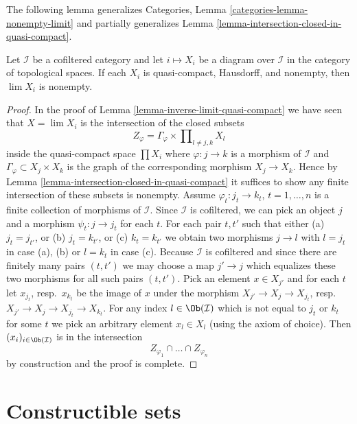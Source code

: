 \noindent
The following lemma generalizes
Categories, Lemma \ref{categories-lemma-nonempty-limit}
and partially generalizes
Lemma \ref{lemma-intersection-closed-in-quasi-compact}.

\begin{lemma}
\label{lemma-nonempty-limit}
Let $\mathcal{I}$ be a cofiltered category and let $i \mapsto X_i$
be a diagram over $\mathcal{I}$ in the category of topological
spaces. If each $X_i$ is quasi-compact, Hausdorff, and nonempty, then
$\lim X_i$ is nonempty.
\end{lemma}

\begin{proof}
In the proof of Lemma \ref{lemma-inverse-limit-quasi-compact}
we have seen that $X = \lim X_i$ is the intersection of the
closed subsets
$$
Z_\varphi = \Gamma_\varphi \times \prod\nolimits_{l \not = j, k} X_l
$$
inside the quasi-compact space $\prod X_i$ where $\varphi : j \to k$
is a morphism of $\mathcal{I}$ and $\Gamma_\varphi \subset X_j \times X_k$
is the graph of the corresponding morphism $X_j \to X_k$. Hence by
Lemma \ref{lemma-intersection-closed-in-quasi-compact}
it suffices to show any finite intersection of these subsets is nonempty.
Assume $\varphi_t : j_t \to k_t$, $t = 1, \ldots, n$ is a finite collection
of morphisms of $\mathcal{I}$. Since $\mathcal{I}$ is cofiltered, we can
pick an object $j$ and a morphism $\psi_t : j \to j_t$ for each $t$.
For each pair $t, t'$ such that either (a) $j_t = j_{t'}$, or
(b) $j_t = k_{t'}$, or (c) $k_t = k_{t'}$ we obtain two morphisms
$j \to l$ with $l = j_t$ in case (a), (b) or $l = k_t$ in case (c).
Because $\mathcal{I}$ is cofiltered and since there are finitely
many pairs $(t, t')$ we may choose a map $j' \to j$ which equalizes
these two morphisms for all such pairs $(t, t')$. Pick an element
$x \in X_{j'}$ and for each $t$ let $x_{j_t}$, resp.\ $x_{k_t}$
be the image of $x$ under the morphism $X_{j'} \to X_j \to X_{j_t}$,
resp.\ $X_{j'} \to X_j \to X_{j_t} \to X_{k_t}$.
For any index $l \in \Ob(\mathcal{I})$ which is not equal to
$j_t$ or $k_t$ for some $t$ we pick an arbitrary element $x_l \in X_l$
(using the axiom of choice). Then $(x_i)_{i \in \Ob(\mathcal{I})}$
is in the intersection 
$$
Z_{\varphi_1} \cap \ldots \cap Z_{\varphi_n}
$$
by construction and the proof is complete.
\end{proof}



\section{Constructible sets}
\label{section-constructible}

